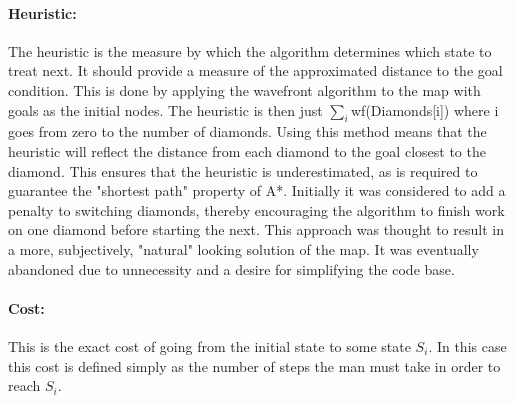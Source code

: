 \paragraph{Heuristic:}
The heuristic is the measure by which the algorithm determines which state to treat next.
It should provide a measure of the approximated distance to the goal condition. 
This is done by applying the wavefront algorithm to the map with goals as the initial nodes.
The heuristic is then just $\sum_{i}$wf(Diamonds[i]) where i goes from zero to the number of diamonds.
Using this method means that the heuristic will reflect the distance from each diamond to the goal closest to the diamond. 
This ensures that the heuristic is underestimated, as is required to guarantee the "shortest path" property of A*.
Initially it was considered to add a penalty to switching diamonds, thereby encouraging the algorithm to finish work on one diamond before starting the next.
This approach was thought to result in a more, subjectively, "natural" looking solution of the map.
It was eventually abandoned due to unnecessity and a desire for simplifying the code base.

\paragraph{Cost:}
This is the exact cost of going from the initial state to some state $S_i$. 
In this case this cost is defined simply as the number of steps the man must take in order to reach $S_i$.\\~\\

